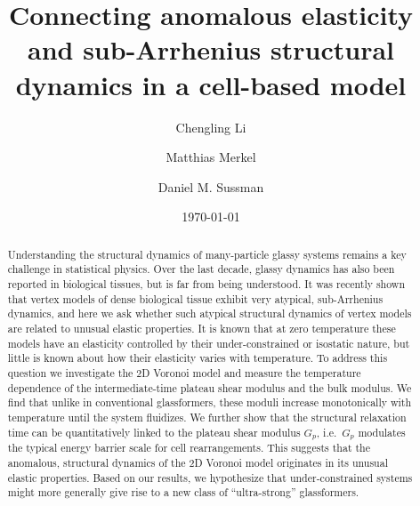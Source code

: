 \documentclass[aps,reprint,superscriptaddress,nofootinbib, notitlepage,prl]{revtex4-2}
\begin{document}
\title{Connecting anomalous elasticity and sub-Arrhenius structural dynamics in a cell-based model}

\author{Chengling Li}
\author{Matthias Merkel}
\author{Daniel M. Sussman}

\date{\today}

\begin{abstract}
	Understanding the structural dynamics of many-particle glassy systems remains a key challenge in statistical physics.
	Over the last decade, glassy dynamics has also been reported in biological tissues, but is far from being understood.
	It was recently shown that vertex models of dense biological tissue exhibit very atypical, sub-Arrhenius dynamics, and here we ask whether such atypical structural dynamics of vertex models are related to unusual elastic properties.
   It is known that at zero temperature these models have an elasticity controlled by their under-constrained or isostatic nature, but little is known about how their elasticity varies with temperature.
	To address this question we investigate the 2D Voronoi model and measure the temperature dependence of the intermediate-time plateau shear modulus and the bulk modulus. 
	We find that unlike in conventional glassformers, these moduli increase monotonically with temperature until the system fluidizes.
	We further show that the structural relaxation time can be quantitatively linked to the plateau shear modulus $G_p$, i.e.\ $G_p$ modulates the typical energy barrier scale for cell rearrangements.
	This suggests that the anomalous, structural dynamics of the 2D Voronoi model originates in its unusual elastic properties.
	Based on our results, we hypothesize that under-constrained systems might more generally give rise to a new class of ``ultra-strong'' glassformers.
\end{abstract}

\maketitle

\end{document}
